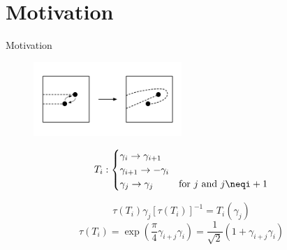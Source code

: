 \documentclass[xcolor=dvipsnames,10pt,aspectratio=169]{beamer}
\newcommand{\MO}{Motivation}
\begin{document}
  \section{\MO}

  \begin{frame}{\MO}
    \begin{multicols}{2}
      \begin{figure}
        \includegraphics[width=0.5\textwidth]{./figures/pwave-braid.pdf}
      \end{figure}

      \vspace{-10mm}
      \begin{equation*}
        T_i :
        \begin{cases}
          \gamma_i \rightarrow \gamma_{i+1} \\
          \gamma_{i+1} \rightarrow -\gamma_i \\
          \gamma_j \rightarrow \gamma_j & \text{for $j$ and $j\neqi+1$}
        \end{cases}
      \end{equation*}

      \begin{equation*}
        \tau(T_i) \gamma_j [\tau(T_i)]^{-1} = T_i(\gamma_j)
      \end{equation*}
      \begin{equation*}
        \tau(T_i) = \exp\left(\dfrac{\pi}{4}\gamma_{i+j}\gamma_i\right) = \dfrac{1}{\sqrt{2}}(1+\gamma_{i+j}\gamma_i)
      \end{equation*}


\end{multicols}
\end{frame}
\end{document}
